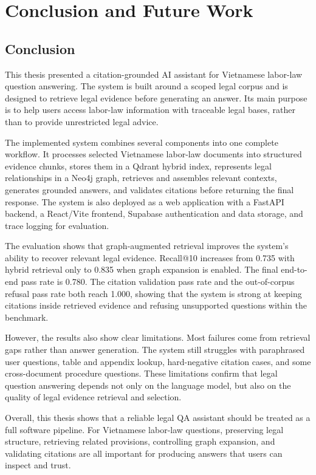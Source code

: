 \section{Conclusion and Future Work}

\subsection{Conclusion}

This thesis presented a citation-grounded AI assistant for Vietnamese labor-law question answering. The system is built around a scoped legal corpus and is designed to retrieve legal evidence before generating an answer. Its main purpose is to help users access labor-law information with traceable legal bases, rather than to provide unrestricted legal advice.

The implemented system combines several components into one complete workflow. It processes selected Vietnamese labor-law documents into structured evidence chunks, stores them in a Qdrant hybrid index, represents legal relationships in a Neo4j graph, retrieves and assembles relevant contexts, generates grounded answers, and validates citations before returning the final response. The system is also deployed as a web application with a FastAPI backend, a React/Vite frontend, Supabase authentication and data storage, and trace logging for evaluation.

The evaluation shows that graph-augmented retrieval improves the system's ability to recover relevant legal evidence. Recall@10 increases from 0.735 with hybrid retrieval only to 0.835 when graph expansion is enabled. The final end-to-end pass rate is 0.780. The citation validation pass rate and the out-of-corpus refusal pass rate both reach 1.000, showing that the system is strong at keeping citations inside retrieved evidence and refusing unsupported questions within the benchmark.

However, the results also show clear limitations. Most failures come from retrieval gaps rather than answer generation. The system still struggles with paraphrased user questions, table and appendix lookup, hard-negative citation cases, and some cross-document procedure questions. These limitations confirm that legal question answering depends not only on the language model, but also on the quality of legal evidence retrieval and selection.

Overall, this thesis shows that a reliable legal QA assistant should be treated as a full software pipeline. For Vietnamese labor-law questions, preserving legal structure, retrieving related provisions, controlling graph expansion, and validating citations are all important for producing answers that users can inspect and trust.

